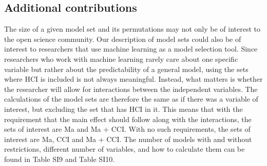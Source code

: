 \subsection{Additional contributions}
The size of a given model set and its permutations may not only be of interest to the open science community. Our description of model sets could also be of interest to researchers that use machine learning as a model selection tool. Since researchers who work with machine learning rarely care about one specific variable but rather about the predictability of a general model, using the sets where HCI is included is not always meaningful. Instead, what matters is whether the researcher will allow for interactions between the independent variables. The calculations of the model sets are therefore the same as if there was a variable of interest, but excluding the set that has HCI in it. This means that with the requirement that the main effect should follow along with the interactions, the sets of interest are Ma and Ma + CCI. With no such requirements, the sets of interest are Ma, CCI and Ma + CCI. The number of models with and without restrictions, different number of variables, and how to calculate them can be found in Table SI9 and Table SI10. 


 
